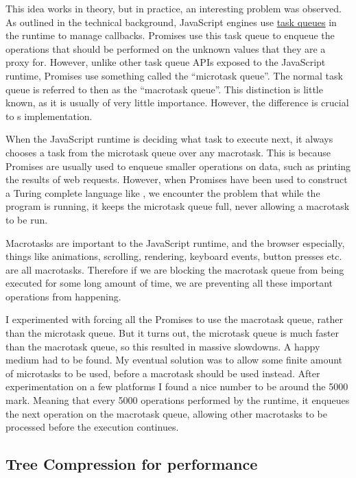 This idea works in theory, but in practice, an interesting problem was observed. As outlined in the technical background, JavaScript engines use \hyperref[background:task-queues]{task queues} in the runtime to manage callbacks. Promises use this task queue to enqueue the operations that should be performed on the unknown values that they are a proxy for. However, unlike other task queue APIs exposed to the JavaScript runtime, Promises use something called the ``microtask queue''. The normal task queue is referred to then as the ``macrotask queue''. This distinction is little known, as it is usually of very little importance. However, the difference is crucial to \Setanta{}s implementation.

When the JavaScript runtime is deciding what task to execute next, it always chooses a task from the microtask queue over any macrotask. This is because Promises are usually used to enqueue smaller operations on data, such as printing the results of web requests. However, when Promises have been used to construct a Turing complete language like \Setanta{}, we encounter the problem that while the program is running, it keeps the microtask queue full, never allowing a macrotask to be run. 

Macrotasks are important to the JavaScript runtime, and the browser especially, things like animations, scrolling, rendering, keyboard events, button presses etc. are all macrotasks. Therefore if we are blocking the macrotask queue from being executed for some long amount of time, we are preventing all these important operations from happening.

I experimented with forcing all the Promises to use the macrotask queue, rather than the microtask queue. But it turns out, the microtask queue is much faster than the macrotask queue, so this resulted in massive slowdowns. A happy medium had to be found.
My eventual solution was to allow some finite amount of microtasks to be used, before a macrotask should be used instead. After experimentation on a few platforms I found a nice number to be around the 5000 mark. Meaning that every 5000 operations performed by the \Setanta{} runtime, it enqueues the next operation on the macrotask queue, allowing other macrotasks to be processed before the execution continues.

\subsection{Tree Compression for performance}

